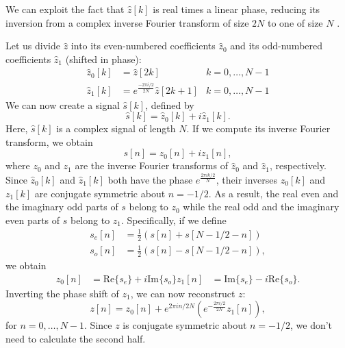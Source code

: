 \documentclass[twocolumn]{article}
\begin{document}
We can exploit the fact that $\hat{z}[k]$ is real times a linear phase, reducing its inversion from a complex inverse Fourier transform of size $2N$ to one of size $N$ \cite{brigham}.

Let us divide $\hat{z}$ into its even-numbered coefficients $\hat{z}_0$ and its odd-numbered coefficients $\hat{z}_1$ (shifted in phase):
\begin{align*}
\hat{z}_0[k] &= \hat{z}[2k] & k=0,\ldots,N-1 \\
\hat{z}_1[k] &= e^{\frac{-2\pi i/2}{2N}}\hat{z}[2k+1] & k=0,\ldots,N-1
\end{align*}
We can now create a signal $\hat{s}[k]$, defined by
\[
\hat{s}[k] = \hat{z}_0[k]+i\hat{z}_1[k].
\]
Here, $\hat{s}[k]$ is a complex signal of length $N$. If we compute its inverse Fourier transform, we obtain
\[
s[n] = z_0[n]+iz_1[n],
\]
where $z_0$ and $z_1$ are the inverse Fourier transforms of $\hat{z}_0$ and $\hat{z}_1$, respectively. Since $\hat{z}_0[k]$ and $\hat{z}_1[k]$ both have the phase $e^{\frac{2\pi i k/2}{N}}$, their inverses $z_0[k]$ and $z_1[k]$ are conjugate symmetric about $n=-1/2$. As a result, the real even and the imaginary odd parts of $s$ belong to $z_0$ while the real odd and the imaginary even parts of $s$ belong to $z_1$. Specifically, if we define
\begin{align*}
s_e[n] &= \frac{1}{2}\left(s[n]+s[N-1/2-n]\right) \\
s_o[n] &= \frac{1}{2}\left(s[n]-s[N-1/2-n]\right),
\end{align*}
we obtain
\begin{align*}
z_0[n] &= \mathrm{Re}\{s_e\}+i\mathrm{Im}\{s_o\}
z_1[n] &= \mathrm{Im}\{s_e\}-i\mathrm{Re}\{s_o\}.
\end{align*}
Inverting the phase shift of $z_1$, we can now reconstruct $z$:
\[
z[n] = z_0[n]+e^{2\pi i n/2N}\left(e^{-\frac{2\pi i/2}{2N}}z_1[n]\right),
\]
for $n=0,\ldots,N-1$. Since $z$ is conjugate symmetric about $n=-1/2$, we don't need to calculate the second half.
\end{document}
